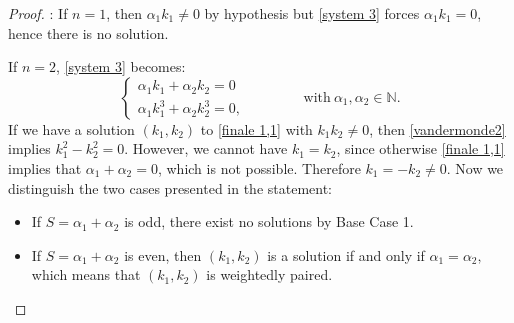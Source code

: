 \documentclass[a4paper,10pt,reqno]{article}
\theoremstyle{definition}
\theoremstyle{plain}
\theoremstyle{plain}
\theoremstyle{definition}
\theoremstyle{plain}
\theoremstyle{plain}
\theoremstyle{plain}
\theoremstyle{definition}
\theoremstyle{definition}
\def \N{\mathbb N}
\begin{document}
\begin{proof}
\smallskip

: If $n=1$, then $\alpha_1 k_1 \neq 0$ by hypothesis but \eqref{system 3} forces $\alpha_1 k_1 = 0$, hence there is no solution.

\smallskip

 If $n=2$, \eqref{system 3}  becomes:
\begin{equation}
\begin{cases}
\alpha_1 k_1 + \alpha_2 k_2 = 0 \\
\alpha_1 k_1^3 + \alpha_2 k_2^3 = 0, 
\end{cases} \qquad \qquad \mbox{with}\ \alpha_1,\alpha_2 \in \N.
\label{finale 1,1}
\end{equation}
If we have a solution $(k_1,k_2)$ to \eqref{finale 1,1} with $k_1k_2 \neq 0$, then \eqref{vandermonde2} implies $k_1^2-k_2^2=0$. However, we cannot have $k_1=k_2$, since otherwise \eqref{finale 1,1} implies that $\alpha_1 + \alpha_2 = 0$, which is not possible. Therefore $k_1=-k_2 \neq 0$. Now we distinguish the two cases presented in the statement:
\begin{itemize}
    \item If $S=\alpha_1+\alpha_2$ is odd, there exist no solutions by Base Case 1. 
    \item If $S=\alpha_1+\alpha_2$ is even, then $(k_1,k_2)$ is a solution if and only if $\alpha_1=\alpha_2,$ which means that $(k_1,k_2)$ is weightedly paired.
\end{itemize}


\end{proof}
\end{document}
